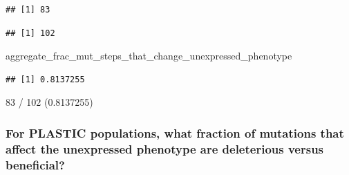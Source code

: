 \documentclass[]{book}
\newenvironment{Shaded}{\begin{snugshade}}{\end{snugshade}}
\newcommand{\KeywordTok}[1]{\textcolor[rgb]{0.13,0.29,0.53}{\textbf{#1}}}
\newcommand{\NormalTok}[1]{#1}
\newcommand{\OperatorTok}[1]{\textcolor[rgb]{0.81,0.36,0.00}{\textbf{#1}}}
\newcommand{\StringTok}[1]{\textcolor[rgb]{0.31,0.60,0.02}{#1}}
\begin{document}
\begin{Shaded}
\end{Shaded}

\begin{verbatim}
## [1] 83
\end{verbatim}

\begin{Shaded}
\end{Shaded}

\begin{verbatim}
## [1] 102
\end{verbatim}

\begin{Shaded}
\begin{Highlighting}[]
\NormalTok{aggregate_frac_mut_steps_that_change_unexpressed_phenotype}
\end{Highlighting}
\end{Shaded}

\begin{verbatim}
## [1] 0.8137255
\end{verbatim}

83 / 102 (0.8137255)

\hypertarget{for-plastic-populations-what-fraction-of-mutations-that-affect-the-unexpressed-phenotype-are-deleterious-versus-beneficial}{%
\subsubsection{For PLASTIC populations, what fraction of mutations that affect the unexpressed phenotype are deleterious versus beneficial?}\label{for-plastic-populations-what-fraction-of-mutations-that-affect-the-unexpressed-phenotype-are-deleterious-versus-beneficial}}
\end{document}
